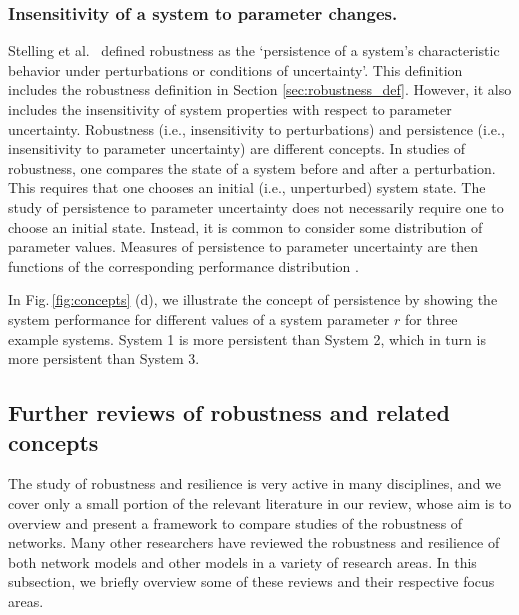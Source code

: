 \documentclass{comnet-mod}
\begin{document}
\subsubsection{Insensitivity of a system to parameter changes.}

Stelling et al.~\cite{Stelling2004} defined robustness as the `persistence of a system's characteristic behavior under perturbations or conditions of uncertainty'. This definition includes the robustness definition in Section \ref{sec:robustness_def}. However, it also includes the insensitivity of system properties with respect to parameter uncertainty. Robustness (i.e., insensitivity to perturbations) and persistence (i.e., insensitivity to parameter uncertainty) are different concepts. In studies of robustness, one compares the state of a system before and after a perturbation. This requires that one chooses an initial (i.e., unperturbed) system state. The study of persistence to parameter uncertainty does not necessarily require one to choose  an initial state. Instead, it is common to consider some distribution of parameter values. Measures of persistence to parameter uncertainty are then functions of the corresponding performance distribution \cite{Stelling2004, Walsh2013}.

In Fig.\,\ref{fig:concepts} (d), we illustrate the concept of persistence by showing the system performance for different values of a system parameter $r$ for three example systems. System 1 is more persistent than System 2, which in turn is more persistent than System 3.


\subsection{Further reviews of robustness and related concepts}\label{sec:more_reviews}

The study of robustness and resilience is very active in many disciplines, and we cover only a small portion of the relevant literature in our review, whose aim is to overview and present a framework to compare studies of the robustness of networks. Many other researchers have reviewed the robustness and resilience of both network models \cite{Gao2015, Catanese2016, Williams2016, Caccioli2018, Oehlers2021, Freitas2022, Lou2023, Artime2024} and other models \cite{Kitano2004, Stelling2004, Kitano2007, Walsh2013, Urruty2016, Keller2018, Krakovska2024} in a variety of research areas. In this subsection, we briefly overview some of these reviews and their respective focus areas.
\end{document}

